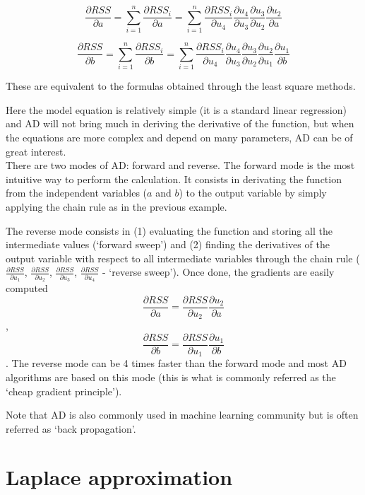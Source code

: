 $$\frac{\partial R S S}{\partial a}=\sum_{i=1}^n \frac{\partial R S S_i}{\partial a}=\sum_{i=1}^{n} \frac{\partial R S S_{i}}{\partial u_{4}} \frac{\partial u_{4}}{\partial u_{3}} \frac{\partial u_{3}}{\partial u_{2}} \frac{\partial u_{2}}{\partial a}$$

$$\frac{\partial R S S}{\partial b}=\sum_{i=1}^n \frac{\partial R S S_i}{\partial b}=\sum_{i=1}^{n} \frac{\partial R S S_{i}}{\partial u_{4}} \frac{\partial u_{4}}{\partial u_{3}} \frac{\partial u_{3}}{\partial u_{2}} \frac{\partial u_{2}}{\partial u_{1}} \frac{\partial u_{1}}{\partial b}$$

These are equivalent to the formulas obtained through the least square methods.

Here the model equation is relatively simple (it is a standard linear regression) and AD will not bring much in deriving the derivative of the function, but when the equations are more complex and depend on many parameters, AD can be of great interest. \\

There are two modes of AD: forward and reverse. The forward mode is the most intuitive way to perform the calculation. It consists in derivating the function from the independent variables ($a$ and $b$) to the output variable by simply applying the chain rule as in the previous example.

The reverse mode consists in (1) evaluating the function and storing all the intermediate values (`forward sweep') and (2) finding the derivatives of the output variable with respect to all intermediate variables through the chain rule ($\frac{\partial R S S}{\partial u_1}$, $\frac{\partial R S S}{\partial u_2}$, $\frac{\partial R S S}{\partial u_3}$, $\frac{\partial R S S}{\partial u_4}$ - `reverse sweep'). Once done, the gradients are easily computed $$\frac{\partial R S S}{\partial a} = \frac{\partial R S S}{\partial u_2} \frac{\partial u_2}{\partial a}$$, $$\frac{\partial R S S}{\partial b} = \frac{\partial R S S}{\partial u_1} \frac{\partial u_1}{\partial b}$$. The reverse mode can be 4 times faster than the forward mode and most AD algorithms are based on this mode (this is what is commonly referred as the `cheap gradient principle').

Note that AD is also commonly used in machine learning community but is often referred as `back propagation'.

\section{Laplace approximation}\label{appendix:Laplace}


